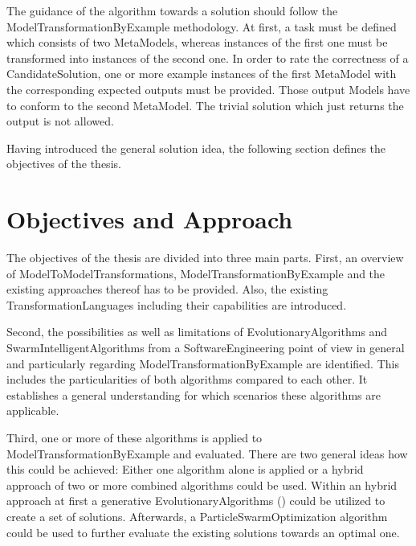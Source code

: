 The guidance of the algorithm towards a solution should follow the \gls{ModelTransformationByExample} methodology. At first, a task must be defined which consists of two \glspl{MetaModel}, whereas instances of the first one must be transformed into instances of the second one. In order to rate the correctness of a \gls{CandidateSolution}, one or more example instances of the first \gls{MetaModel} with the corresponding expected outputs must be provided. Those output \glspl{Model} have to conform to the second \gls{MetaModel}. The trivial solution which just returns the output is not allowed.

Having introduced the general solution idea, the following section defines the objectives of the thesis.

\section{Objectives and Approach}
\label{secObjectivesAndApproach}

The objectives of the thesis are divided into three main parts. 
First, an overview of \glspl{ModelToModelTransformation}, \gls{ModelTransformationByExample} and the existing approaches thereof has to be provided. Also, the existing \glspl{TransformationLanguage} including their capabilities are introduced. %

Second, the possibilities as well as limitations of \glspl{EvolutionaryAlgorithm} and \glspl{SwarmIntelligentAlgorithm} from a \gls{SoftwareEngineering} point of view in general and particularly regarding \gls{ModelTransformationByExample} are identified. This includes the particularities of both algorithms compared to each other. It establishes a general understanding for which scenarios these algorithms are applicable. %

Third, one or more of these algorithms is applied to \gls{ModelTransformationByExample} and evaluated. There are two general ideas how this could be achieved: Either one algorithm alone is applied or a hybrid approach of two or more combined algorithms could be used. Within an hybrid approach at first a generative \glspl{EvolutionaryAlgorithm} (\cite{koza92}) could be utilized to create a set of solutions. Afterwards, a \gls{ParticleSwarmOptimization} algorithm could be used to further evaluate the existing solutions towards an optimal one.

